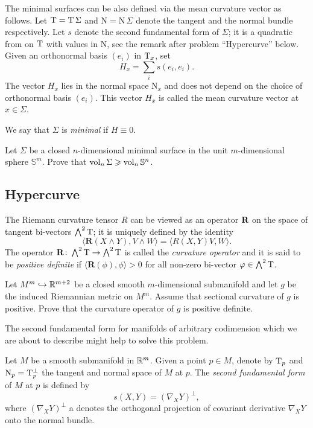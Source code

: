 The minimal surfaces can be also defined via the mean curvature vector as follows.
Let $\mathrm{T}=\mathrm{T}\,\Sigma$ and $\mathrm{N}=\mathrm{N}\,\Sigma$ denote the tangent and the normal bundle respectively.
Let $s$ denote the second fundamental form of $\Sigma$;
it is a quadratic from on $\mathrm{T}$ with values in $\mathrm{N}$,
see the remark after problem ``Hypercurve'' below. 
Given an orthonormal basis $(e_i)$ in $\mathrm{T}_x$, set 
$$H_x=\sum_i s(e_i,e_i).$$
The vector $H_x$ lies in the normal space $\mathrm{N}_x$
and does not depend on the choice of orthonormal basis $(e_i)$.
This vector $H_x$ is called the mean curvature vector at $x\in \Sigma$. 

We say that $\Sigma$ is \emph{minimal} if $H\equiv 0$.

\begin{pr}
Let $\Sigma$ be a closed $n$-dimensional 
minimal surface
in the unit $m$-dimensional sphere $\mathbb{S}^m$.
Prove that
$\operatorname{\rm vol}\nolimits_n \Sigma\geqslant \operatorname{\rm vol}\nolimits_n \mathbb{S}^n$.
\end{pr}

\subsection*{Hypercurve}
\label{codim=2}

The Riemann curvature tensor $R$
can be viewed as an operator $\text{\bf R}$ on the space of tangent bi-vectors $\bigwedge^2 \mathrm{T}$;
it is uniquely defined by the identity
$$\langle\mathbf{R}(X\wedge Y),V\wedge W\rangle
=
\langle R(X,Y)V,W\rangle.$$
The operator $\mathbf{R}\colon\bigwedge^2 \mathrm{T}\to \bigwedge^2 \mathrm{T}$ is called the \emph{curvature operator} and it is said to be {}\emph{positive definite} if
$\langle\mathbf{R}(\phi),\phi\rangle>0$ for all non-zero
bi-vector $\varphi\in\bigwedge^2 \mathrm{T}$.


\begin{pr}
Let $M^m\hookrightarrow \mathbb{R}^{m+2}$ be a closed smooth $m$-dimensional
submanifold and let  $g$ be the  induced Riemannian metric on $M^m$.
Assume that sectional curvature of $g$ is positive.
Prove that the curvature operator of $g$ is positive definite.
\end{pr}

The second fundamental form for manifolds of arbitrary codimension which we are about to describe might help to solve this problem.

Let $M$ be a smooth submanifold in $\mathbb{R}^m$.
Given a point $p\in M$, denote by $\mathrm{T}_p$ and $\mathrm{N}_p=\mathrm{T}_p^\bot$
the tangent and normal space of $M$ at $p$.
The \emph{second fundamental form}\label{page:second fundamental form} of $M$ at $p$ is defined by 
\[s(X,Y)=(\nabla_X Y)^\bot,\]
where $(\nabla_X Y)^\bot$ a denotes the orthogonal projection of covariant derivative $\nabla_X Y$ onto the normal bundle.

